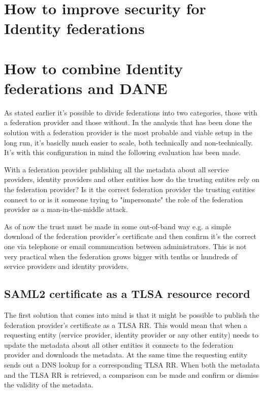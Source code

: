\section{How to improve security for Identity federations}
\section{How to combine Identity federations and DANE}
As stated earlier it's possible to divide federations into two categories, those with a federation provider and those without.
In the analysis that has been done the solution with a federation provider is the most probable and viable setup in the long run, it's basiclly much easier to scale, both technically and non-technically.
It's with this configuration in mind the following evaluation has been made.


With a federation provider publishing all the metadata about all service providers, identity providers and other entities how do the trusting entites rely on the federation provider?
Is it the correct federation provider the trusting entities connect to or is it someone trying to "impersonate" the role of the federation provider as a man-in-the-middle attack.

As of now the trust must be made in some out-of-band way e.g. a simple download of the federation provider's certificate and then confirm it's the correct one via telephone or email communcation between administrators.
This is not very practical when the federation grows bigger with tenths or hundreds of service providers and identity providers.

\subsection{SAML2 certificate as a TLSA resource record}
\label{subsec:saml2-certificate-as-tlsa}
The first solution that comes into mind is that it might be possible to publish the federation provider's certificate as a TLSA RR.
This would mean that when a requesting entity (service provider, identity provider or any other entity) needs to update the metadata about all other entities it connects to the federation provider and downloads the metadata.
At the same time the requesting entity sends out a DNS lookup for a corresponding TLSA RR.
When both the metadata and the TLSA RR is retrieved, a comparison can be made and confirm or dismiss the validity of the metadata.

